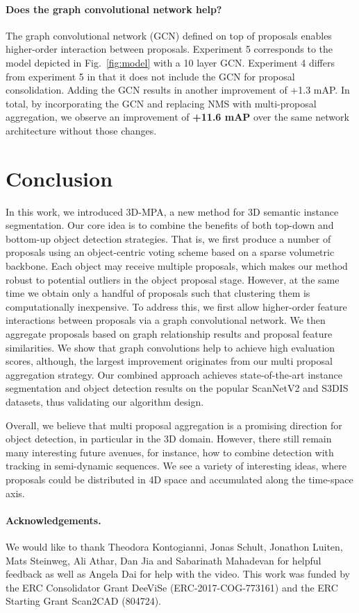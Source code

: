 \documentclass[10pt,twocolumn,letterpaper]{article}
\newcommand{\reffig}[1]{Fig.~\ref{fig:#1}}
\newcommand{\circlenum}[1]{{\textcircled{\footnotesize{#1}}}}
\newcommand{\parag}[1]{\vspace{0px}\paragraph{#1}\hspace{-9pt}}
\newcommand{\name}{3D-MPA}
\begin{document}
\parag{Does the graph convolutional network help?} The graph convolutional network (GCN) defined on top of proposals enables higher-order interaction between proposals.
Experiment \circlenum{5} corresponds to the model depicted in \reffig{model} with a 10 layer GCN.
Experiment \circlenum{4} differs from experiment \circlenum{5} in that it does not include the GCN for proposal consolidation.
Adding the GCN results in another improvement of +1.3 mAP.
In total, by incorporating the GCN and replacing NMS with multi-proposal aggregation, we observe an improvement of \textbf{+11.6 mAP} over the same network architecture without those changes.
 

\section{Conclusion}
In this work, we introduced \name{}, a new method for 3D semantic instance segmentation.
Our core idea is to combine the benefits of both top-down and bottom-up object detection strategies.
That is, we first produce a number of proposals using an object-centric voting scheme based on a sparse volumetric backbone.
Each object may receive multiple proposals, which makes our method robust to potential outliers in the object proposal stage.
However, at the same time we obtain only a handful of proposals such that clustering them is computationally inexpensive.
To address this, we first allow higher-order feature interactions between proposals via a graph convolutional network. 
We then aggregate proposals based on graph relationship results and proposal feature similarities. 
We show that graph convolutions help to achieve high evaluation scores,
although, the largest improvement originates from our multi proposal aggregation strategy.
Our combined approach achieves state-of-the-art instance segmentation and object detection results on the popular ScanNetV2 and S3DIS datasets, thus validating our algorithm design.

Overall, we believe that multi proposal aggregation is a promising direction for object detection, in particular in the 3D domain. 
However, there still remain many interesting future avenues, for instance, how to combine detection with tracking in semi-dynamic sequences. 
We see a variety of interesting ideas, where proposals could be distributed in 4D space and accumulated along the time-space axis.

\parag{Acknowledgements.} 
We would like to thank Theodora Kontogianni, Jonas Schult, Jonathon Luiten, Mats Steinweg, Ali Athar, Dan Jia and Sabarinath Mahadevan for helpful feedback
as well as Angela Dai for help with the video.
This work was funded by the ERC Consolidator Grant DeeViSe (ERC-2017-COG-773161) and the ERC Starting Grant Scan2CAD (804724). 
\balance
{\small


}
\end{document}
